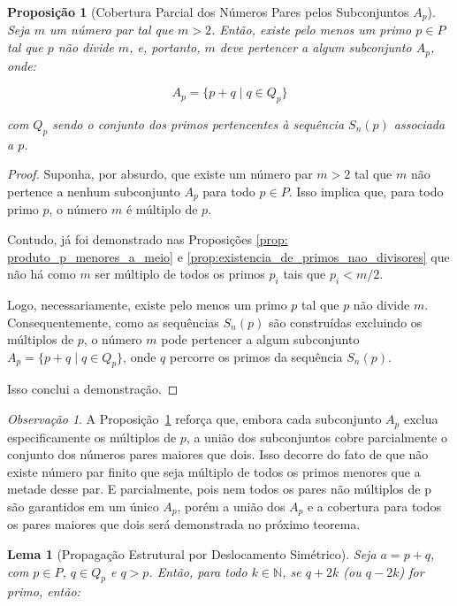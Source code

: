 \documentclass[a4paper,11pt]{article}
\newtheorem{lemma}[theorem]{Lema}
\newtheorem{proposition}[theorem]{Proposição}
\theoremstyle{definition}
\theoremstyle{remark}
\newtheorem{remark}[theorem]{Observação}
\begin{document}
\begin{otherlanguage}{brazil}
	\begin{proposition}[Cobertura Parcial dos Números Pares pelos Subconjuntos \(A_p\)]\label{prop:cobertura_parcial_dos_pares}
		Seja \(m\) um número par tal que \(m > 2\). Então, existe pelo menos um primo \(p \in P\) tal que \(p\) não divide \(m\), e, portanto, \(m\) deve pertencer a algum subconjunto \(A_p\), onde:
		
		\[
		A_p = \{p + q \mid q \in Q_p\}
		\]
		
		com \(Q_p\) sendo o conjunto dos primos pertencentes à sequência \(S_n(p)\) associada a \(p\).
	\end{proposition}
	
	\begin{proof}
		Suponha, por absurdo, que existe um número par \(m > 2\) tal que \(m\) não pertence a nenhum subconjunto \(A_p\) para todo \(p \in P\). Isso implica que, para todo primo \(p\), o número \(m\) é múltiplo de \(p\).
		
		Contudo, já foi demonstrado nas Proposições \ref{prop: produto_p_menores_a_meio} e \ref{prop:existencia_de_primos_nao_divisores} que não há como \(m\) ser múltiplo de todos os primos \( p_i \) tais que \( p_i < m/2 \). 
		
		Logo, necessariamente, existe pelo menos um primo \(p\) tal que \(p\) não divide \(m\). Consequentemente, como as sequências \(S_n(p)\) são construídas excluindo os múltiplos de \(p\), o número \(m\) pode pertencer a algum subconjunto \(A_p = \{p + q \mid q \in Q_p\}\), onde \(q\) percorre os primos da sequência \(S_n(p)\).
		
		Isso conclui a demonstração.
	\end{proof}
	\begin{remark}
		A Proposição~\ref{prop:cobertura_parcial_dos_pares} reforça que, embora cada subconjunto \(A_p\) exclua especificamente os múltiplos de \(p\), a união dos subconjuntos cobre parcialmente o conjunto dos números pares maiores que dois. Isso decorre do fato de que não existe número par finito que seja múltiplo de todos os primos menores que a metade desse par. E parcialmente, pois nem todos os pares não múltiplos de p são garantidos em um único \(A_p\), porém a união dos \(A_p\) e a cobertura para todos os pares maiores que dois será demonstrada no próximo teorema.
	\end{remark}
	
	\begin{lemma}[Propagação Estrutural por Deslocamento Simétrico]
		Seja \(a = p + q\), com \(p \in P\), \(q \in Q_p\) e \(q > p\). Então, para todo \(k \in \mathbb{N}\), se \(q + 2k\) (ou \(q - 2k\)) for primo, então:
		

\end{lemma}
\end{otherlanguage}
\end{document}
